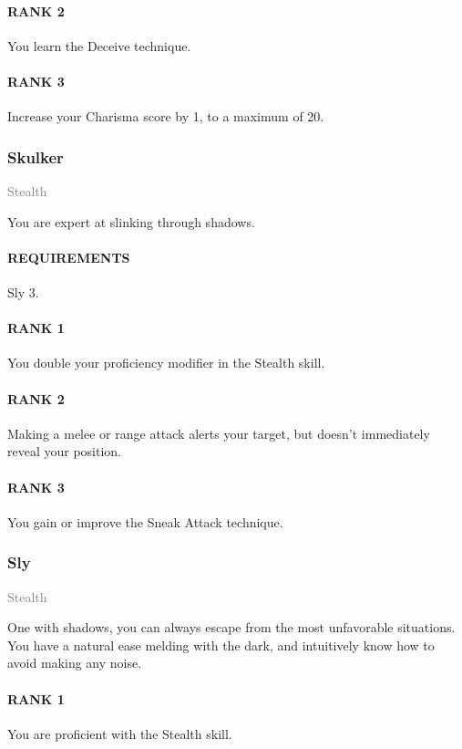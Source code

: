 \paragraph{RANK 2} You learn the Deceive technique.
\paragraph{RANK 3} Increase your Charisma score by 1, to a maximum of 20.

\subsubsection{Skulker} \label{feat::skulker}
\small{\textcolor{gray}{Stealth}}

\normalsize
You are expert at slinking through shadows.
\paragraph{REQUIREMENTS} Sly 3.
\paragraph{RANK 1} You double your proficiency modifier in the Stealth skill.
\paragraph{RANK 2} Making a melee or range attack alerts your target, but doesn't immediately reveal your position.
\paragraph{RANK 3} You gain or improve the Sneak Attack technique.

\subsubsection{Sly} \label{feat::sly}
\small{\textcolor{gray}{Stealth}}

\normalsize
One with shadows, you can always escape from the most unfavorable situations.
You have a natural ease melding with the dark, and intuitively know how to avoid making any noise.
\paragraph{RANK 1} You are proficient with the Stealth skill.
